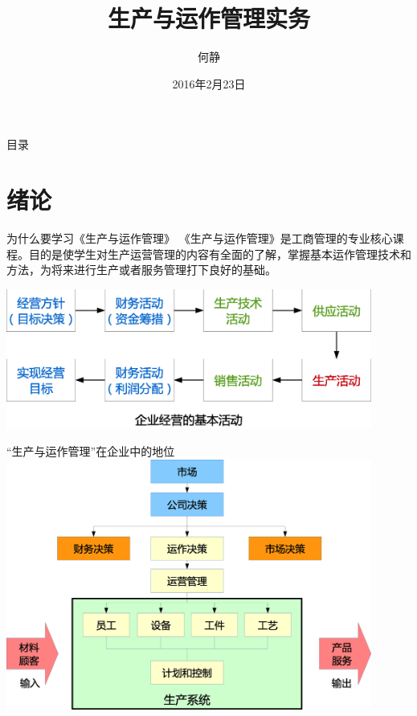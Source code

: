 \documentclass[11pt]{beamer}
\author{何静}
\title{生产与运作管理实务}
\institute{东莞职业技术学院}
\date{2016年2月23日}
\begin{document}
	\maketitle
	
	\begin{frame}{目录}
		\tableofcontents
	\end{frame}
	
	\section{绪论}
	\begin{frame}{为什么要学习《生产与运作管理》}
		《生产与运作管理》是工商管理的专业核心课程。目的是使学生对生产运营管理的内容有全面的了解，掌握基本运作管理技术和方法，为将来进行生产或者服务管理打下良好的基础。
		
		\includegraphics[width=0.9\textwidth]{img/生产活动}
	\end{frame}
	
	\begin{frame}{“生产与运作管理”在企业中的地位}
		\includegraphics[width=0.9\textwidth]{img/生产系统}
	\end{frame}
	
	
\end{document}
